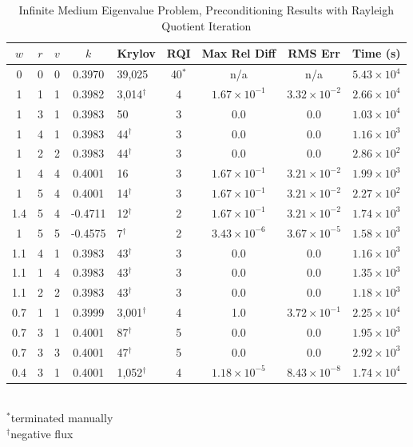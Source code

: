 \begin{table}[!h]
\caption{Infinite Medium Eigenvalue Problem, Preconditioning Results with Rayleigh Quotient Iteration}
\begin{center}
\begin{tabular}{| c | c | c | c | l | c | c | c | c |}
\hline
$w$ & $r$ & $v$ & $k$ & Krylov & RQI & Max Rel Diff & RMS Err & Time (s) \\[0.5ex]
\hline
0    & 0 & 0 & 0.3970 & 39,025              & 40$^{*}$  & n/a & n/a & $5.43 \times 10^{4}$ \\
1    & 1 & 1 & 0.3982 & 3,014$^{\dag}$ & 4 & $1.67 \times 10^{-1}$ & $3.32 \times 10^{-2}$ & $2.66 \times 10^{4}$ \\
1    & 3 & 1 & 0.3983 & 50                     & 3 & 0.0 & 0.0 & $1.03 \times 10^{4}$ \\
1    & 4 & 1 & 0.3983 & 44$^{\dag}$      & 3 & 0.0 & 0.0 & $1.16 \times 10^{3}$ \\
1    & 2 & 2 & 0.3983 & 44$^{\dag}$      & 3 & 0.0 & 0.0 & $2.86 \times 10^{2}$ \\
1    & 4 & 4 & 0.4001 & 16                     & 3 & $1.67 \times 10^{-1}$ & $3.21 \times 10^{-2}$ & $1.99 \times 10^{3}$ \\
1    & 5 & 4 & 0.4001 & 14$^{\dag}$     & 3 & $1.67 \times 10^{-1}$ & $3.21 \times 10^{-2}$ & $2.27 \times 10^{2}$ \\
1.4 & 5 & 4 & -0.4711 & 12$^{\dag}$    & 2 & $1.67 \times 10^{-1}$ & $3.21 \times 10^{-2}$ & $1.74 \times 10^{3}$ \\
1    & 5 & 5 & -0.4575 & 7$^{\dag}$      & 2 & $3.43 \times 10^{-6}$ & $3.67 \times 10^{-5}$ & $1.58 \times 10^{3}$ \\
\hline
1.1 & 4 & 1 & 0.3983 & 43$^{\dag}$      & 3 & 0.0 & 0.0 & $1.16 \times 10^{3}$ \\
1.1 & 1 & 4 & 0.3983 & 43$^{\dag}$      & 3 & 0.0 & 0.0 & $1.35 \times 10^{3}$ \\
1.1 & 2 & 2 & 0.3983 & 43$^{\dag}$      & 3 & 0.0 & 0.0 & $1.18 \times 10^{3}$ \\
\hline
0.7 & 1 & 1 & 0.3999 & 3,001$^{\dag}$ & 4 & 1.0 & $3.72 \times 10^{-1}$ & $2.25 \times 10^{4}$ \\
0.7 & 3 & 1 & 0.4001 & 87$^{\dag}$      & 5 & 0.0 & 0.0 & $1.95 \times 10^{3}$ \\
0.7 & 3 & 3 & 0.4001 & 47$^{\dag}$      & 5 & 0.0 & 0.0 & $2.92 \times 10^{3}$ \\
0.4 & 3 & 1 & 0.4001 & 1,052$^{\dag}$ & 4 & $1.18 \times 10^{-5}$ & $8.43 \times 10^{-8}$      & $1.74 \times 10^{4}$ \\
\hline 
\end{tabular}\\
$^{*}$terminated manually\\
$^{\dag}$negative flux
\end{center}
\label{table:impi RQI}
\end{table}
